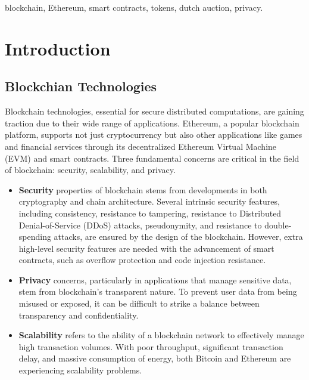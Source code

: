 \documentclass[conference]{IEEEtran}
\begin{document}
\begin{IEEEkeywords}
blockchain, Ethereum, smart contracts, tokens, dutch auction, privacy.
\end{IEEEkeywords}

\section{Introduction}

\subsection{Blockchian Technologies}
Blockchain technologies, essential for secure distributed computations, are gaining traction due to their wide range of applications\cite{javaidBlockchainTechnologyApplications2021}. Ethereum, a popular blockchain platform, supports not just cryptocurrency but also other applications like games and financial services through its decentralized Ethereum Virtual Machine (EVM) and smart contracts\cite{pothavarjulaInvestigationDecentralizedLedger2022}. Three fundamental concerns are critical in the field of blockchain: security, scalability, and privacy. 

\begin{itemize}
    \item \textbf{Security} properties of blockchain stems from developments in both cryptography and chain architecture. Several intrinsic security features, including consistency, resistance to tampering, resistance to Distributed Denial-of-Service (DDoS) attacks, pseudonymity, and resistance to double-spending attacks, are ensured by the design of the blockchain\cite{zhangSecurityPrivacyBlockchain2020}. However, extra high-level security features are needed with the advancement of smart contracts, such as overflow protection and code injection resistance.

    \item \textbf{Privacy} concerns, particularly in applications that manage sensitive data, stem from blockchain's transparent nature. To prevent user data from being misused or exposed, it can be difficult to strike a balance between transparency and confidentiality.
    
    \item \textbf{Scalability} refers to the ability of a blockchain network to effectively manage high transaction volumes. With poor throughput, significant transaction delay, and massive consumption of energy, both Bitcoin and Ethereum are experiencing scalability problems\cite{zhouSolutionsScalabilityBlockchain2020}.
    
\end{itemize}
\end{document}
